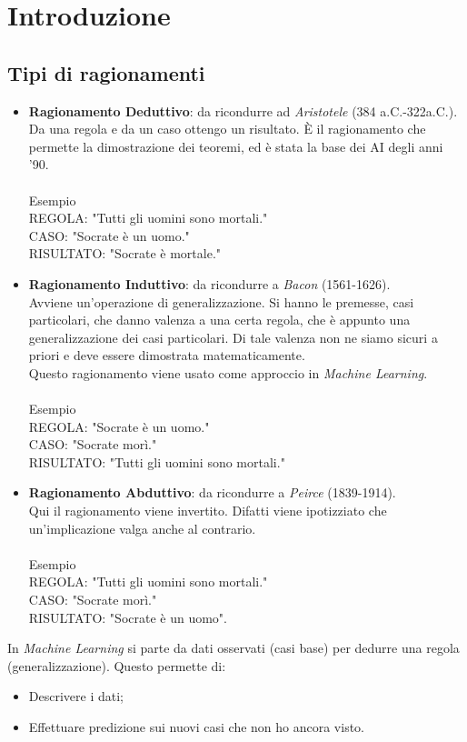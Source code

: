 \documentclass[10pt,a4paper]{book}
\begin{document}
\chapter{Introduzione}

\section{Tipi di ragionamenti}
\begin{itemize}
\item \textbf{Ragionamento Deduttivo}: da ricondurre ad \textit{Aristotele} (384 a.C.-322a.C.).\\
Da una regola e da un caso ottengo un risultato. \`E il ragionamento che permette la dimostrazione dei teoremi, ed \`e stata la base dei AI degli anni '90.\\\\
Esempio\\
REGOLA: "Tutti gli uomini sono mortali."\\
CASO: "Socrate \`e un uomo."\\
RISULTATO: "Socrate \`e mortale."
\item \textbf{Ragionamento Induttivo}: da ricondurre a \textit{Bacon} (1561-1626).\\
Avviene un'operazione di generalizzazione. Si hanno le premesse, casi particolari, che danno valenza a una certa regola, che \`e appunto una generalizzazione dei casi particolari. Di tale valenza non ne siamo sicuri a priori e deve essere dimostrata matematicamente.\\
Questo ragionamento viene usato come approccio in \textit{Machine Learning}.\\\\
Esempio\\
REGOLA: "Socrate \`e un uomo."\\
CASO: "Socrate mor\`i."\\
RISULTATO: "Tutti gli uomini sono mortali."
\item \textbf{Ragionamento Abduttivo}: da ricondurre a \textit{Peirce} (1839-1914).\\
Qui il ragionamento viene invertito. Difatti viene ipotizziato che un'implicazione valga anche al contrario.\\\\
Esempio\\
REGOLA: "Tutti gli uomini sono mortali."\\
CASO: "Socrate mor\`i."\\
RISULTATO: "Socrate \`e un uomo".
\end{itemize}
\noindent
In \textit{Machine Learning} si parte da dati osservati (casi base) per dedurre una regola (generalizzazione). Questo permette di:
\begin{itemize}
\item Descrivere i dati;
\item Effettuare predizione sui nuovi casi che non ho ancora visto.
\end{itemize}
\end{document}
